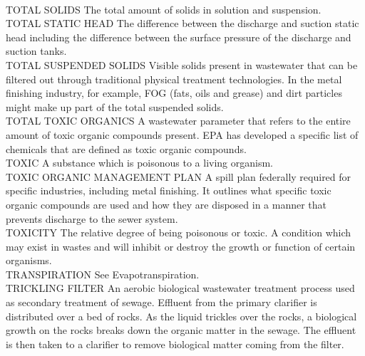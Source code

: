 \vspace{0.3cm}\\
TOTAL SOLIDS
The total amount of solids in solution and suspension.
\vspace{0.3cm}\\
TOTAL STATIC HEAD
The difference between the discharge and suction static head including the difference between the surface pressure of the discharge and suction tanks.
\vspace{0.3cm}\\
TOTAL SUSPENDED SOLIDS
Visible solids present in wastewater that can be filtered out through traditional physical treatment technologies. In the metal finishing industry, for example, FOG (fats, oils and grease) and dirt particles might make up part of the total suspended solids.
\vspace{0.3cm}\\
TOTAL TOXIC ORGANICS
A wastewater parameter that refers to the entire amount of toxic organic compounds present.   EPA has developed a specific list of chemicals that are defined as toxic organic compounds.
\vspace{0.3cm}\\
TOXIC
A substance which is poisonous to a living organism.
\vspace{0.3cm}\\
TOXIC ORGANIC MANAGEMENT PLAN
A spill plan federally required for specific industries, including metal finishing. It outlines what specific toxic organic compounds are used and how they are disposed in a manner that prevents discharge to the sewer system.
\vspace{0.3cm}\\
TOXICITY
The relative degree of being poisonous or toxic. A condition which may exist in wastes and will inhibit or destroy the growth or function of certain organisms.
\vspace{0.3cm}\\
TRANSPIRATION
See Evapotranspiration.
\vspace{0.3cm}\\
TRICKLING FILTER
An aerobic biological wastewater treatment process used as secondary treatment of sewage. Effluent from the primary clarifier is distributed over a bed of rocks. As the liquid trickles over the rocks, a biological growth on the rocks breaks down the organic matter in the sewage. The effluent is then taken to a clarifier to remove biological matter coming from the filter.
\vspace{0.3cm}\\
